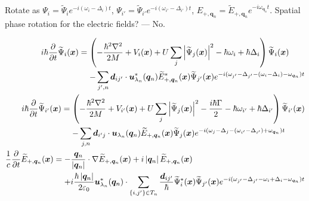 Rotate as $\Psi_{i} = \widetilde{\Psi}_i e^{-i (\omega_i - \Delta_i)t}$, $\Psi_{i'} = \widetilde{\Psi}_{i'} e^{-i (\omega_{i'} - \Delta_{i'})t}$, $E_{+,\bm{q}_n} = \widetilde{E}_{+, \bm{q}_n} e^{-i \omega_{\bm{q}_n}t}$. Spatial phase rotation for the electric fields? --- No.

\begin{subequations}
    \begin{align}
        \begin{split}
            i \hbar \frac{\partial}{\partial t} \widetilde{\Psi}_i(\bm{x}) &= \left( -\frac{\hbar^2 \nabla^2}{2M} + V_i(\bm{x}) + U \sum_j \abs{\widetilde{\Psi}_j(\bm{x})}^2 - \hbar \omega_{i} + \hbar \Delta_i \right) \widetilde{\Psi}_i(\bm{x})\\
            &\relphantom{=} - \sum_{j',n} \bm{d}_{ij'} \cdot \bm{u}^*_{\lambda_n}(\bm{q}_n) \widetilde{E}_{+,\bm{q}_n}^*(\bm{x}) \widetilde{\Psi}_{j'}(\bm{x}) e^{-i (\omega_{j'} - \Delta_{j'} - (\omega_i - \Delta_i) - \omega_{\bm{q}_n})t}
        \end{split}\\
        \begin{split}
            i \hbar \frac{\partial}{\partial t} \widetilde{\Psi}_{i'}(\bm{x}) &= \left( -\frac{\hbar^2 \nabla^2}{2M} + V_{i'}(\bm{x}) + U \sum_j \abs{\widetilde{\Psi}_j(\bm{x})}^2 - \frac{i\hbar \Gamma}{2} - \hbar \omega_{i'} + \hbar \Delta_{i'}\right) \widetilde{\Psi}_{i'}(\bm{x})\\
            &\relphantom{=} - \sum_{j,n} \bm{d}_{i'j} \cdot \bm{u}_{\lambda_n}(\bm{q}_n) \widetilde{E}_{+,\bm{q}_n}(\bm{x}) \widetilde{\Psi}_{j}(\bm{x})  e^{-i (\omega_{j} - \Delta_j - (\omega_{i'} - \Delta_{i'}) + \omega_{\bm{q}_n})t}
        \end{split}\\
        \begin{split}
          \frac{1}{c} \frac{\partial}{\partial t} \widetilde{E}_{+, \bm{q}_n} (\bm{x}) &= - \frac{\bm{q}_n}{\abs{\bm{q}_n}} \cdot \nabla \widetilde{E}_{+, \bm{q}_n}(\bm{x}) + i \abs{\bm{q}_n} \widetilde{E}_{+, \bm{q}_n}(\bm{x})\\
          &\relphantom{=} + i \frac{\hbar \abs{\bm{q}_n}}{2 \varepsilon_0} \bm{u}^*_{\lambda_n}(\bm{q}_n) \cdot \sum_{\{i,j'\}\in T_n} \frac{\bm{d}_{ij'}}{\hbar} \widetilde{\Psi}^*_i(\bm{x}) \widetilde{\Psi}_{j'}(\bm{x}) e^{-i (\omega_{j'} - \Delta_{j'} -\omega_i + \Delta_i - \omega_{\bm{q}_n})t}
        \end{split}
    \end{align}
\end{subequations}

